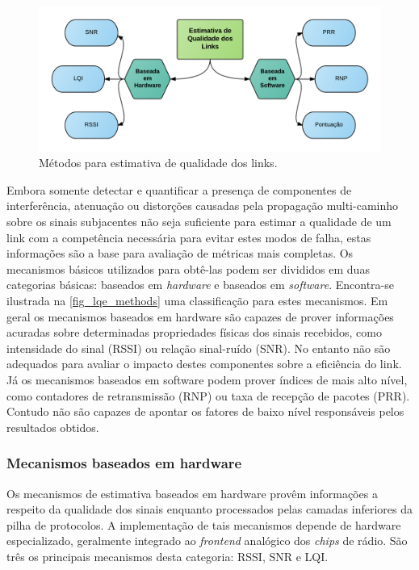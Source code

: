 \documentclass[
	12pt,				%
	openright,			%
	oneside,
	a4paper,			%
	english,			%
	french,				%
	spanish,			%
	brazil				%
	]{abntex2}
\begin{document}
\begin{figure}[htb]
	\caption{\label{fig_lqe_methods}Métodos para estimativa de qualidade dos links.}
	\begin{center}
		\includegraphics[width=\linewidth]{WSN_LQE_Methods}
	\end{center}
\end{figure}

Embora somente detectar e quantificar a presença de componentes de interferência, atenuação ou distorções causadas pela propagação multi-caminho sobre os sinais subjacentes não seja suficiente para estimar a qualidade de um link com a competência necessária para evitar estes modos de falha, estas informações são a base para avaliação de métricas mais completas. Os mecanismos básicos utilizados para obtê-las podem ser divididos em duas categorias básicas: baseados em \textit{hardware} e baseados em \textit{software}. Encontra-se ilustrada na \autoref{fig_lqe_methods} uma classificação para estes mecanismos. Em geral os mecanismos baseados em hardware são capazes de prover informações acuradas sobre determinadas propriedades físicas dos sinais recebidos, como intensidade do sinal (RSSI) ou relação sinal-ruído (SNR). No entanto não são adequados para avaliar o impacto destes componentes sobre a eficiência do link. Já os mecanismos baseados em software podem prover índices de mais alto nível, como contadores de retransmissão (RNP) ou taxa de recepção de pacotes (PRR). Contudo não são capazes de apontar os fatores de baixo nível responsáveis pelos resultados obtidos.

\subsubsection{Mecanismos baseados em hardware}

Os mecanismos de estimativa baseados em hardware provêm informações a respeito da qualidade dos sinais enquanto processados pelas camadas inferiores da pilha de protocolos. A implementação de tais mecanismos depende de hardware especializado, geralmente integrado ao \textit{frontend} analógico dos \textit{chips} de rádio. São três os principais mecanismos desta categoria: RSSI, SNR e LQI.
\end{document}
